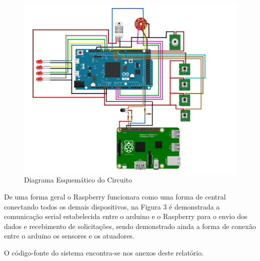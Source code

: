 \begin{figure}[!h]
\caption{Diagrama Esquemático do Circuito}
\centering
\includegraphics[width=\textwidth]{figuras/esquematico}
\end{figure}

\par De uma forma geral o Raspberry funcionara como uma forma de central conectando todos os demais dispositivos, na Figura 3 é demonstrada a comunicação serial estabelecida entre o arduino e o Raspberry para o envio dos dados e recebimento de solicitações, sendo demonstrado ainda a forma de conexão entre o arduino os sensores e os atuadores.
\par O código-fonte do sistema encontra-se nos anexos deste relatório.
